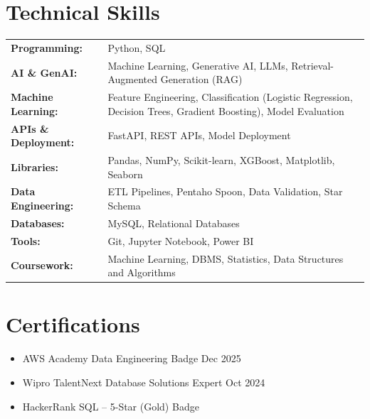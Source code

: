 \documentclass[a4paper,12pt]{article}
\begin{document}
\section{Technical Skills}
\begin{tabularx}{\linewidth}{@{}l X@{}}
\textbf{Programming:} & \normalsize{Python, SQL}\\
\textbf{AI \& GenAI:} & \normalsize{Machine Learning, Generative AI, LLMs, Retrieval-Augmented Generation (RAG)}\\
\textbf{Machine Learning:} & \normalsize{Feature Engineering, Classification (Logistic Regression, Decision Trees, Gradient Boosting), Model Evaluation}\\
\textbf{APIs \& Deployment:} & \normalsize{FastAPI, REST APIs, Model Deployment}\\
\textbf{Libraries:} & \normalsize{Pandas, NumPy, Scikit-learn, XGBoost, Matplotlib, Seaborn}\\
\textbf{Data Engineering:} & \normalsize{ETL Pipelines, Pentaho Spoon, Data Validation, Star Schema}\\
\textbf{Databases:} & \normalsize{MySQL, Relational Databases}\\
\textbf{Tools:} & \normalsize{Git, Jupyter Notebook, Power BI}\\
\textbf{Coursework:} & \normalsize{Machine Learning, DBMS, Statistics, Data Structures and Algorithms}\\

\end{tabularx}


\section{Certifications}

\begin{itemize}[leftmargin=1em, itemsep=10pt, label=--]
    \item AWS Academy Data Engineering Badge \hfill Dec 2025
    \item Wipro TalentNext Database Solutions Expert \hfill Oct 2024
    \item HackerRank SQL -- 5-Star (Gold) Badge
\end{itemize}


\vfill
\center
\end{document}
